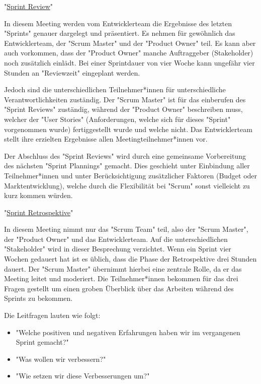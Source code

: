 "\underline{Sprint Review}"

In diesem Meeting werden vom Entwicklerteam die Ergebnisse des letzten "Sprints" genauer dargelegt und präsentiert. Es nehmen für gewöhnlich das Entwicklerteam, der "Scrum Master" und der "Product Owner" teil. Es kann aber auch vorkommen, dass der "Product Owner" manche Auftraggeber (Stakeholder) noch zusätzlich einlädt. Bei einer Sprintdauer von vier Woche kann ungefähr vier Stunden an "Reviewzeit" eingeplant werden.

Jedoch sind die unterschiedlichen Teilnehmer*innen für unterschiedliche Verantwortlichkeiten zuständig. Der "Scrum Master" ist für das einberufen des "Sprint Reviews" zuständig, während der "Product Owner" beschreiben muss, welcher der "User Stories" (Anforderungen, welche sich für dieses "Sprint" vorgenommen wurde) fertiggestellt wurde und welche nicht. Das Entwicklerteam stellt ihre erzielten Ergebnisse allen Meetingteilnehmer*innen vor.

Der Abschluss des "Sprint Reviews" wird durch eine gemeinsame Vorbereitung des nächsten "Sprint Plannings" gemacht. Dies geschieht unter Einbindung aller Teilnehmer*innen und unter Berücksichtigung zusätzlicher Faktoren (Budget oder Marktentwicklung), welche durch die Flexibilität bei "Scrum" sonst vielleicht zu kurz kommen würden. \cite{SprintReview}

"\underline{Sprint Retrospektive}"

In diesem Meeting nimmt nur das "Scrum Team" teil, also der "Scrum Master", der "Product Owner" und das Entwicklerteam. Auf die unterschiedlichen "Stakeholder" wird in dieser Besprechung verzichtet. Wenn ein Sprint vier Wochen gedauert hat ist es üblich, dass die Phase der Retrospektive drei Stunden dauert. Der "Scrum Master" übernimmt hierbei eine zentrale Rolle, da er das Meeting leitet und moderiert. Die Teilnehmer*innen bekommen für das drei Fragen gestellt um einen groben Überblick über das Arbeiten während des Sprints zu bekommen. \cite{SprintRetrospektive}

Die Leitfragen lauten wie folgt:

\begin{itemize}
    \item "Welche positiven und negativen Erfahrungen haben wir im vergangenen Sprint gemacht?" \cite{SprintRetrospektive}
    \item "Was wollen wir verbessern?" \cite{SprintRetrospektive}
    \item "Wie setzen wir diese Verbesserungen um?" \cite{SprintRetrospektive}
\end{itemize}
